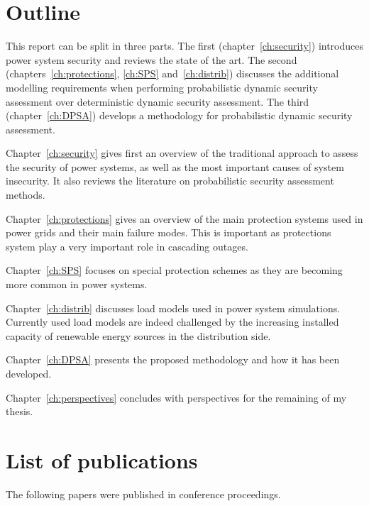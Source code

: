 \section{Outline}

This report can be split in three parts. The first (chapter~\ref{ch:security}) introduces power system security and reviews the state of the art. The second (chapters~\ref{ch:protections}, \ref{ch:SPS} and~\ref{ch:distrib}) discusses the additional modelling requirements when performing probabilistic dynamic security assessment over deterministic dynamic security assessment. The third (chapter~\ref{ch:DPSA}) develops a methodology for probabilistic dynamic security assessment.


Chapter~\ref{ch:security} gives first an overview of the traditional approach to assess the security of power systems, as well as the most important causes of system insecurity. It also reviews the literature on probabilistic security assessment methods.

Chapter~\ref{ch:protections} gives an overview of the main protection systems used in power grids and their main failure modes. This is important as protections system play a very important role in cascading outages.

Chapter~\ref{ch:SPS} focuses on special protection schemes as they are becoming more common in power systems.

Chapter~\ref{ch:distrib} discusses load models used in power system simulations. Currently used load models are indeed challenged by the increasing installed capacity of renewable energy sources in the distribution side.

Chapter~\ref{ch:DPSA} presents the proposed methodology and how it has been developed.

Chapter~\ref{ch:perspectives} concludes with perspectives for the remaining of my thesis.

\section{List of publications}

The following papers were published in conference proceedings.

